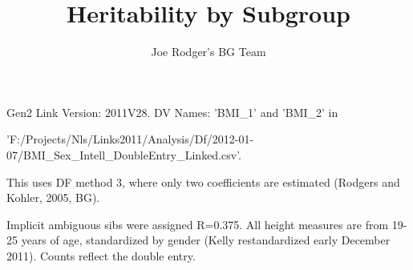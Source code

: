\documentclass[a4paper]{article}
\title{Heritability by Subgroup}
\author{Joe Rodger's BG Team}
\begin{document}
\maketitle


Gen2 Link Version: 2011V28.  DV Names: 'BMI_1' and 'BMI_2' in

'F:/Projects/Nls/Links2011/Analysis/Df/2012-01-07/BMI_Sex_Intell_DoubleEntry_Linked.csv'.

This uses DF method 3, where only two coefficients are estimated (Rodgers and Kohler, 2005, BG).

Implicit ambiguous sibs were assigned R=0.375. All height measures are from 19-25 years of age, standardized by gender (Kelly restandardized early December 2011).  Counts reflect the double entry.
\end{document}
